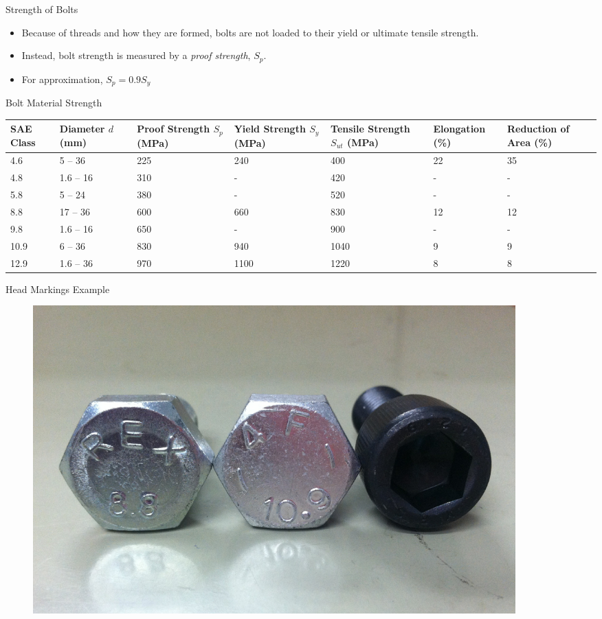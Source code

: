 \documentclass[10pt, svgnames]{beamer}
\begin{document}
\begin{frame}[label={sec:orgb4d0726}]{Strength of Bolts}
\begin{itemize}
\item Because of threads and how they are formed, bolts are not loaded to their yield or ultimate tensile strength.
\item Instead, bolt strength is measured by a \emph{proof strength}, $S_p$.
\item For approximation, $S_p = 0.9 S_y$
\end{itemize}
\end{frame}

\begin{frame}[label={sec:orga94c203}]{Bolt Material Strength}
\small
\begin{tabular}{ p{0.8cm} p{1.2cm} p{1.2cm} p{1.2cm} p{1.5cm} p{1.5cm} p{1.3cm} }
  \toprule
  SAE Class & Diameter $d$ (mm) & Proof Strength $S_p$ (MPa) & Yield Strength $S_y$ (MPa) & Tensile Strength $S_{ut}$ (MPa) & Elongation (\%) & Reduction of Area (\%) \\
  \midrule
  4.6 & 5 – 36 & 225 & 240 & 400 & 22 & 35 \\
  4.8 & 1.6 – 16 & 310 & - & 420 & - & - \\
  5.8 & 5 – 24 & 380 & - & 520 & - & - \\
  8.8 & 17 – 36 & 600 & 660 & 830 & 12 & 12 \\
  9.8 & 1.6 – 16 & 650 & - & 900 & - & - \\
  10.9 & 6 – 36 & 830 & 940 & 1040 & 9 & 9 \\
  12.9 & 1.6 – 36 & 970 & 1100 & 1220 & 8 & 8 \\
  \bottomrule
\end{tabular}
\end{frame}

\begin{frame}[label={sec:org4cc3183}]{Head Markings Example}
\begin{figure}[h]
  \centering
  \includegraphics[width=0.9\textwidth]{pictures/metric-head-markings}
\end{figure}
\end{frame}
\end{document}
